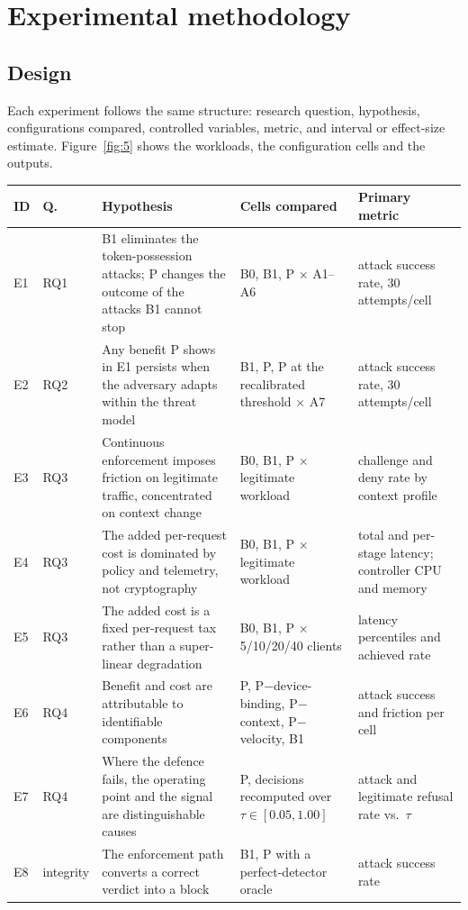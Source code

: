 \section{Experimental methodology}
\label{sec:method}

\subsection{Design}

Each experiment follows the same structure: research question, hypothesis, configurations compared, controlled variables, metric, and interval or effect-size estimate. Figure~\ref{fig:5} shows the workloads, the configuration cells and the outputs.

\begin{table}[t]
\centering
\small
\begin{tabular}{lp{0.9cm}p{6.2cm}p{4.6cm}p{3.6cm}}
\toprule
ID & Q. & Hypothesis & Cells compared & Primary metric \\
\midrule
E1 & RQ1 & B1 eliminates the token-possession attacks; P changes the outcome of the attacks B1 cannot stop & B0, B1, P $\times$ A1--A6 & attack success rate, 30 attempts/cell \\
E2 & RQ2 & Any benefit P shows in E1 persists when the adversary adapts within the threat model & B1, P, P at the recalibrated threshold $\times$ A7 & attack success rate, 30 attempts/cell \\
E3 & RQ3 & Continuous enforcement imposes friction on legitimate traffic, concentrated on context change & B0, B1, P $\times$ legitimate workload & challenge and deny rate by context profile \\
E4 & RQ3 & The added per-request cost is dominated by policy and telemetry, not cryptography & B0, B1, P $\times$ legitimate workload & total and per-stage latency; controller CPU and memory \\
E5 & RQ3 & The added cost is a fixed per-request tax rather than a super-linear degradation & B0, B1, P $\times$ 5/10/20/40 clients & latency percentiles and achieved rate \\
E6 & RQ4 & Benefit and cost are attributable to identifiable components & P, P$-$device-binding, P$-$context, P$-$velocity, B1 & attack success and friction per cell \\
E7 & RQ4 & Where the defence fails, the operating point and the signal are distinguishable causes & P, decisions recomputed over $\tau \in [0.05, 1.00]$ & attack and legitimate refusal rate vs.\ $\tau$ \\
E8 & integrity & The enforcement path converts a correct verdict into a block & B1, P with a perfect-detector oracle & attack success rate \\
\bottomrule
\end{tabular}
\end{table}

